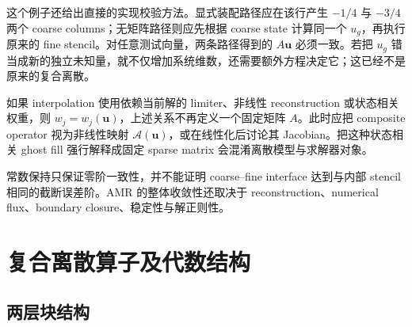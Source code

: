这个例子还给出直接的实现校验方法。显式装配路径应在该行产生 $-1/4$ 与 $-3/4$ 两个 coarse columns；无矩阵路径则应先根据 coarse state 计算同一个 $u_g$，再执行原来的 fine stencil。对任意测试向量，两条路径得到的 $A\bm u$ 必须一致。若把 $u_g$ 错当成新的独立未知量，就不仅增加系统维数，还需要额外方程决定它；这已经不是原来的复合离散。

如果 interpolation 使用依赖当前解的 limiter、非线性 reconstruction 或状态相关权重，则 $w_j=w_j(\bm u)$，上述关系不再定义一个固定矩阵 $A$。此时应把 composite operator 视为非线性映射 $\mathcal A(\bm u)$，或在线性化后讨论其 Jacobian。把这种状态相关 ghost fill 强行解释成固定 sparse matrix 会混淆离散模型与求解器对象。

\begin{warningbox}
常数保持只保证零阶一致性，并不能证明 coarse--fine interface 达到与内部 stencil 相同的截断误差阶。AMR 的整体收敛性还取决于 reconstruction、numerical flux、boundary closure、稳定性与解正则性。
\end{warningbox}

\section{复合离散算子及代数结构}
\label{sec:amr-composite-operator}

\subsection{两层块结构}

